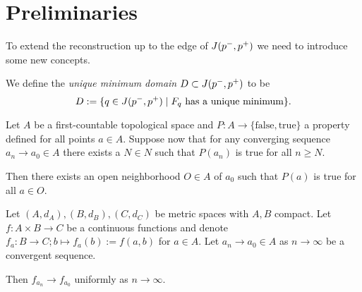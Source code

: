 \section{Preliminaries}
To extend the reconstruction up to the edge of $J(p^-,p^+)$ we need to introduce some new concepts.

\begin{definition}\label{def:uniquemindomain}
   We define the \emph{unique minimum domain} $D\subset J(p^-,p^+)$ to be 
   \begin{equation}
        D:=\{q\in J(p^-,p^+) \mid F_q\text{ has a unique minimum}\}.
   \end{equation} 
\end{definition}


\begin{lemma}\label{lem:firstcount}
    Let $A$ be a first-countable topological space and $P:A\to \{\text{false},\text{true}\}$ a property defined for all points $a\in A$. Suppose now that for any converging sequence $a_n\to a_0\in A$ there exists a $N\in N$ such that $P(a_n)$ is true for all $n\ge N$.
    
    Then there exists an open neighborhood $O\in A$ of $a_0$ such that $P(a)$ is true for all $a\in O$.
\end{lemma}

\begin{lemma}\label{lem:unifconvoncompact}
    Let $(A,d_A),(B,d_B),(C,d_C)$ be metric spaces with $A,B$ compact. Let $f:A\times B\to C$ be a continuous functions and denote $f_a:B\to C;b\mapsto f_a(b):=f(a,b)$ for $a\in A$. Let $a_n\to a_0 \in A$ as $n\to\infty$ be a convergent sequence.

    Then $f_{a_n}\to f_{a_0}$ uniformly as $n\to \infty$.
\end{lemma}

